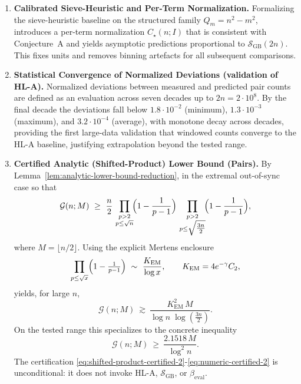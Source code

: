 \documentclass[11pt]{article}
\theoremstyle{inline}
\theoremstyle{break}
\theoremstyle{break}
\theoremstyle{break}
\theoremstyle{break}
\theoremstyle{break}
\theoremstyle{break}
\theoremstyle{break}
\theoremstyle{inline}
\newcommand{\xLambdaMinLimit}{1.8\cdot 10^{-2}} %
\newcommand{\xLambdaMaxLimit}{1.3\cdot 10^{-3}} %
\newcommand{\xLambdaAvgLimit}{3.2\cdot 10^{-4}} %
\newcommand{\SGB}{\mathcal{S}_{\scriptscriptstyle\mathrm{GB}}}
\newcommand{\betacal}{\beta_{\mathrm{eval}}}
\newcommand{\Kem}{K_{\mathrm{EM}}}              %
\begin{document}
\begin{enumerate}
  \item \textbf{Calibrated Sieve-Heuristic and Per-Term Normalization.}
  Formalizing the sieve-heuristic baseline on the structured family \(Q_m=n^2-m^2\), introduces a per-term normalization \( C_\star(n;I) \) that is consistent with Conjecture~A and yields asymptotic predictions proportional to \( \SGB(2n) \). This fixes units and removes binning artefacts for all subsequent comparisons.

  \item \textbf{Statistical Convergence of Normalized Deviations (validation of HL-A).}
  Normalized deviations between measured and predicted pair counts are defined as an evaluation across seven decades up to \(2n=2\cdot 10^8\). By the final decade the deviations fall below
  \( \xLambdaMinLimit \) (minimum), \( \xLambdaMaxLimit \) (maximum), and \( \xLambdaAvgLimit \) (average), with monotone decay across decades, providing the first large-data validation that windowed counts converge to the HL-A baseline, justifying extrapolation beyond the tested range.

  \item \textbf{Certified Analytic (Shifted-Product) Lower Bound (Pairs).}
  By Lemma~\ref{lem:analytic-lower-bound-reduction}, in the extremal out-of-sync case so that
  \begin{equation}\label{eq:shifted-product-certified-2}
    \mathcal{G}(n;M)\ \ge\ \frac{n}{2}\,
    \prod_{\substack{p>2\\ p\le \sqrt{n}}}\!\Bigl(1-\frac{1}{p-1}\Bigr)\,
    \prod_{\substack{p>2\\ p\le \sqrt{\tfrac{3n}{2}}}}\!\Bigl(1-\frac{1}{p-1}\Bigr),
  \end{equation}
  where \( M=\lfloor n/2\rfloor \). Using the explicit Mertens enclosure
  \cite{RosserSchoenfeld1962, Dusart2010, HardyLittlewood1923, MontgomeryVaughan2007}
  \begin{equation}\label{eq:mertens-enclosure-2}
    \prod_{p\le \sqrt{x}}\Bigl(1-\tfrac{1}{p-1}\Bigr)\ \sim\ \frac{\Kem}{\log x},
    \qquad \Kem=4e^{-\gamma}C_2,
  \end{equation}
  yields, for large \(n\),
  \begin{equation}\label{eq:asymp-certified-2}
    \mathcal{G}(n;M)\ \gtrsim\ \frac{\Kem^2\,M}{\log n\;\log(\tfrac{3n}{2})}.
  \end{equation}
  On the tested range this specializes to the concrete inequality
  \begin{equation}\label{eq:numeric-certified-2}
    \mathcal{G}(n;M)\ \ge\ \frac{2.1518\,M}{\log^2 n}.
  \end{equation}
  The certification \eqref{eq:shifted-product-certified-2}-\eqref{eq:numeric-certified-2} is unconditional: it does not invoke HL-A, \( \SGB \), or \( \betacal \).


\end{enumerate}
\end{document}
